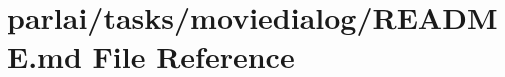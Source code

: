 \hypertarget{parlai_2tasks_2moviedialog_2README_8md}{}\section{parlai/tasks/moviedialog/\+R\+E\+A\+D\+ME.md File Reference}
\label{parlai_2tasks_2moviedialog_2README_8md}
